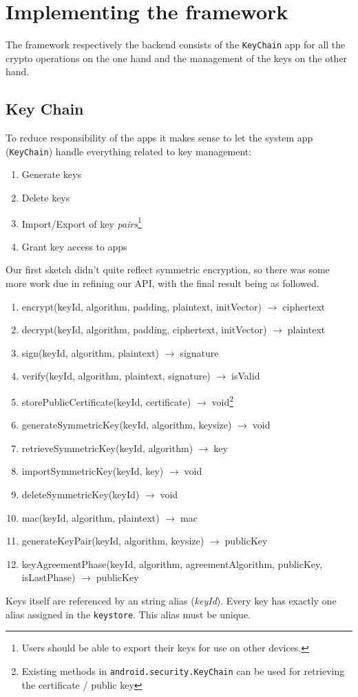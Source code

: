 \documentclass[a4paper,draft]{scrartcl}
\newcommand{\totype}{\(\to\;\)}
\begin{document}
\section{Implementing the framework}

	The framework respectively the backend consists of the \texttt{KeyChain} app for all the crypto operations on the one hand and the management of the keys on the other hand.

	\subsection{Key Chain}
		To reduce responsibility of the apps it makes sense to let the system app (\texttt{KeyChain}) handle everything related to key management:
		\begin{enumerate}
			\item Generate keys
			\item Delete keys
			\item Import/Export of key \emph{pairs}\footnote{Users should be able to export their keys for use on other devices.}
			\item Grant key access to apps
		\end{enumerate}
		Our first sketch didn't quite reflect symmetric encryption, so there was some more work due in refining our API, with the final result being as followed.

		\begin{enumerate}
		\tt
			\item encrypt(keyId, algorithm, padding, plaintext, initVector) \totype ciphertext
			\item decrypt(keyId, algorithm, padding, ciphertext, initVector) \totype plaintext
			\item sign(keyId, algorithm, plaintext) \totype signature
			\item verify(keyId, algorithm, plaintext, signature) \totype isValid
			\item storePublicCertificate(keyId, certificate) \totype void\footnote{Existing methods in \texttt{android.security.KeyChain} can be used for retrieving the certificate / public key}
			\item generateSymmetricKey(keyId, algorithm, keysize) \totype void
			\item retrieveSymmetricKey(keyId, algorithm) \totype key
			\item importSymmetricKey(keyId, key) \totype void
			\item deleteSymmetricKey(keyId) \totype void
			\item mac(keyId, algorithm, plaintext) \totype mac
			\item generateKeyPair(keyId, algorithm, keysize) \totype publicKey
			\item keyAgreementPhase(keyId, algorithm, agreementAlgorithm, publicKey, isLastPhase) \totype publicKey
		\end{enumerate}
		Keys itself are referenced by an string alias (\emph{keyId}). Every key has exactly one alias assigned in the \texttt{keystore}. This alias must be unique.
	
\end{document}
